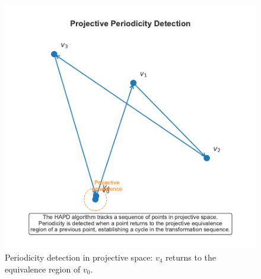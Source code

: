 \begin{figure}[htbp]
\begin{minipage}{\textwidth}
\centering
\includegraphics[width=\textwidth]{figures/output/projective_periodicity_visualization.pdf}
\caption{Periodicity detection in projective space: $v_4$ returns to the equivalence region of $v_0$.}
\label{fig:projective_visualization}
\end{minipage}
\end{figure}

